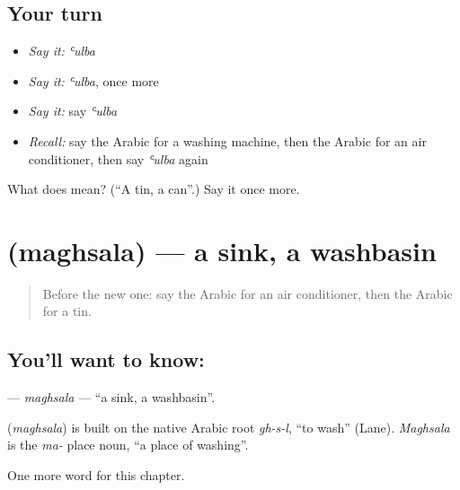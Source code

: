 \subsection*{Your turn}
\begin{itemize}
\raggedright
  \item \emph{Say it:} \emph{ʿulba}
  \item \emph{Say it:} \emph{ʿulba}, once more
  \item \emph{Say it:} say \emph{ʿulba}
  \item \emph{Recall:} say the Arabic for a washing machine, then the Arabic for an air conditioner, then say \emph{ʿulba} again
\end{itemize}

\begin{tcolorbox}[breakable,colback=teal!4,colframe=teal!35!black,title={Before you move on}]
What does  mean? (\textquotedblleft{}A tin, a can\textquotedblright{}.) Say it once more.
\end{tcolorbox}
\section[\texorpdfstring{\ar{مغسلة} (maghsala)}{مغسلة (maghsala)}]{ (maghsala) — a sink, a washbasin}

\label{lesson:AR-C181-maghsala}



\begin{quote}
Before the new one: say the Arabic for an air conditioner, then the Arabic for a tin.
\end{quote}

\subsection*{You'll want to know: }
\textbf{} — \emph{maghsala} — \textquotedblleft{}a sink, a washbasin\textquotedblright{}.

\begin{cousinweb}
\textbf{} (\emph{maghsala}) is built on the native Arabic root \emph{gh-s-l}, \textquotedblleft{}to wash\textquotedblright{} (Lane). \emph{Maghsala} is the \emph{ma-} place noun, \textquotedblleft{}a place of washing\textquotedblright{}.
\end{cousinweb}

\begin{grammarlens}[title={What you've built}]
One more word for this chapter.
\end{grammarlens}

